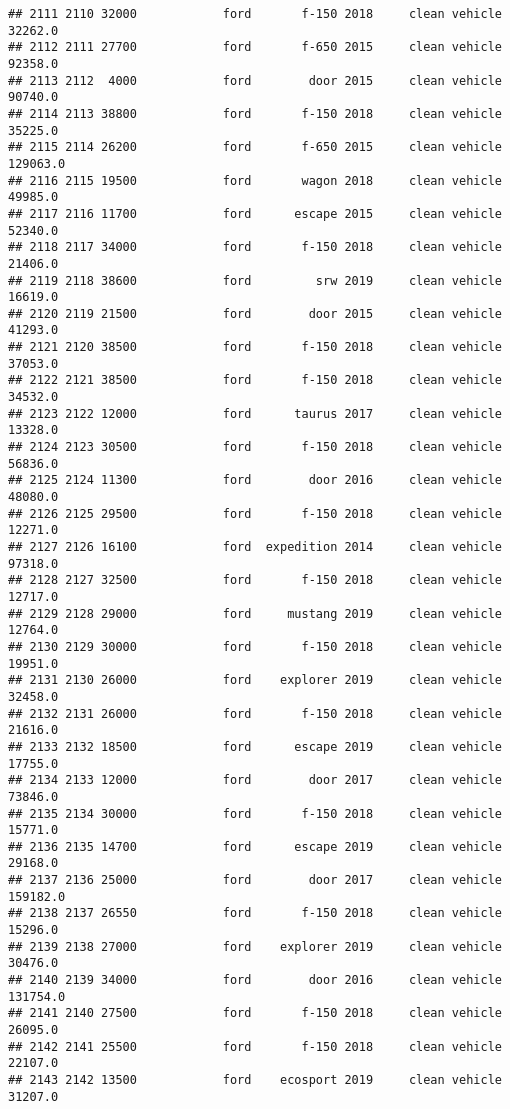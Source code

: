 \documentclass[
]{article}
\begin{document}
\begin{verbatim}
## 2111 2110 32000            ford       f-150 2018     clean vehicle   32262.0
## 2112 2111 27700            ford       f-650 2015     clean vehicle   92358.0
## 2113 2112  4000            ford        door 2015     clean vehicle   90740.0
## 2114 2113 38800            ford       f-150 2018     clean vehicle   35225.0
## 2115 2114 26200            ford       f-650 2015     clean vehicle  129063.0
## 2116 2115 19500            ford       wagon 2018     clean vehicle   49985.0
## 2117 2116 11700            ford      escape 2015     clean vehicle   52340.0
## 2118 2117 34000            ford       f-150 2018     clean vehicle   21406.0
## 2119 2118 38600            ford         srw 2019     clean vehicle   16619.0
## 2120 2119 21500            ford        door 2015     clean vehicle   41293.0
## 2121 2120 38500            ford       f-150 2018     clean vehicle   37053.0
## 2122 2121 38500            ford       f-150 2018     clean vehicle   34532.0
## 2123 2122 12000            ford      taurus 2017     clean vehicle   13328.0
## 2124 2123 30500            ford       f-150 2018     clean vehicle   56836.0
## 2125 2124 11300            ford        door 2016     clean vehicle   48080.0
## 2126 2125 29500            ford       f-150 2018     clean vehicle   12271.0
## 2127 2126 16100            ford  expedition 2014     clean vehicle   97318.0
## 2128 2127 32500            ford       f-150 2018     clean vehicle   12717.0
## 2129 2128 29000            ford     mustang 2019     clean vehicle   12764.0
## 2130 2129 30000            ford       f-150 2018     clean vehicle   19951.0
## 2131 2130 26000            ford    explorer 2019     clean vehicle   32458.0
## 2132 2131 26000            ford       f-150 2018     clean vehicle   21616.0
## 2133 2132 18500            ford      escape 2019     clean vehicle   17755.0
## 2134 2133 12000            ford        door 2017     clean vehicle   73846.0
## 2135 2134 30000            ford       f-150 2018     clean vehicle   15771.0
## 2136 2135 14700            ford      escape 2019     clean vehicle   29168.0
## 2137 2136 25000            ford        door 2017     clean vehicle  159182.0
## 2138 2137 26550            ford       f-150 2018     clean vehicle   15296.0
## 2139 2138 27000            ford    explorer 2019     clean vehicle   30476.0
## 2140 2139 34000            ford        door 2016     clean vehicle  131754.0
## 2141 2140 27500            ford       f-150 2018     clean vehicle   26095.0
## 2142 2141 25500            ford       f-150 2018     clean vehicle   22107.0
## 2143 2142 13500            ford    ecosport 2019     clean vehicle   31207.0

\end{verbatim}
\end{document}
